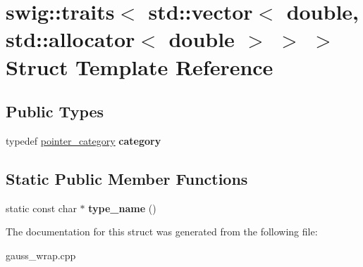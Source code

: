\hypertarget{structswig_1_1traits_3_01std_1_1vector_3_01double_00_01std_1_1allocator_3_01double_01_4_01_4_01_4}{\section{swig\-:\-:traits$<$ std\-:\-:vector$<$ double, std\-:\-:allocator$<$ double $>$ $>$ $>$ Struct Template Reference}
\label{structswig_1_1traits_3_01std_1_1vector_3_01double_00_01std_1_1allocator_3_01double_01_4_01_4_01_4}
}
\subsection*{Public Types}
\begin{DoxyCompactItemize}
\item 
\hypertarget{structswig_1_1traits_3_01std_1_1vector_3_01double_00_01std_1_1allocator_3_01double_01_4_01_4_01_4_a70c608477567968995b8654448121595}{typedef \hyperlink{structswig_1_1pointer__category}{pointer\-\_\-category} {\bfseries category}}\label{structswig_1_1traits_3_01std_1_1vector_3_01double_00_01std_1_1allocator_3_01double_01_4_01_4_01_4_a70c608477567968995b8654448121595}

\end{DoxyCompactItemize}
\subsection*{Static Public Member Functions}
\begin{DoxyCompactItemize}
\item 
\hypertarget{structswig_1_1traits_3_01std_1_1vector_3_01double_00_01std_1_1allocator_3_01double_01_4_01_4_01_4_aa34cfd8fe03073e6f32fc33cf48a5cf3}{static const char $\ast$ {\bfseries type\-\_\-name} ()}\label{structswig_1_1traits_3_01std_1_1vector_3_01double_00_01std_1_1allocator_3_01double_01_4_01_4_01_4_aa34cfd8fe03073e6f32fc33cf48a5cf3}

\end{DoxyCompactItemize}


The documentation for this struct was generated from the following file\-:\begin{DoxyCompactItemize}
\item 
gauss\-\_\-wrap.\-cpp\end{DoxyCompactItemize}
